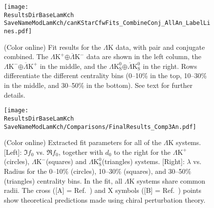 \documentclass[ALICE,manyauthors]{cernphprep}
\newcommand{\ResultsDirBaseLamKch}{/home/jesse/Analysis/FemtoAnalysis/Results/Results_cLamcKch_20190319/}
\newcommand{\ResultsDirBaseLamKs}{/home/jesse/Analysis/FemtoAnalysis/Results/Results_cLamK0_20190319/}
\newcommand{\MomRes}{_MomResCrctn}%
\newcommand{\NonFlatBgdLamKch}{_NonFlatBgdCrctnLamK0LamKchPolynomial}
\newcommand{\NonFlatBgdLamKs}{_NonFlatBgdCrctnLamK0LamKchPolynomial}
\newcommand{\ResNum}{_3Res}
\newcommand{\PrimMaxDecay}{_PrimMaxDecay10fm}
\newcommand{\ResMethod}{_UsingXiDataAndCoulombOnly}
\newcommand{\ParamFixAndShareLamKch}{_ShareLam_Dualie_ShareLam_ShareRadii}
\newcommand{\ParamFixAndShareLamKs}{_ShareLam_Dualie_ShareLam_ShareRadii}
\newcommand{\SaveNameModLamKch}{\MomRes\NonFlatBgdLamKch\ResNum\PrimMaxDecay\ResMethod\ParamFixAndShareLamKch}
\newcommand{\SaveNameModLamKs}{\MomRes\NonFlatBgdLamKs\ResNum\PrimMaxDecay\ResMethod\ParamFixAndShareLamKs}
\newcommand{\LamK}{$\Lambda$K\xspace}
\newcommand{\LamKchP}{$\Lambda\mathrm{K^{+}}$\xspace}
\newcommand{\ALamKchM}{$\overline{\Lambda}\mathrm{K^{-}}$\xspace}
\newcommand{\LamKchM}{$\Lambda\mathrm{K^{-}}$\xspace}
\newcommand{\ALamKchP}{$\overline{\Lambda}\mathrm{K^{+}}$\xspace}
\newcommand{\LamKs}{$\Lambda\mathrm{K^{0}_{S}}$\xspace}
\newcommand{\ALamKs}{$\overline{\Lambda}\mathrm{K^{0}_{S}}$\xspace}
\begin{document}
\begin{figure}[h!]
  \centering
  \texttt{[image: \\ResultsDirBaseLamKch\\SaveNameModLamKch/canKStarCfwFits\_CombineConj\_AllAn\_LabelLines.pdf]}
  \caption[\LamK data with fits]
  {
  (Color online) Fit results for the \LamK data, with pair and conjugate combined.
  The \LamKchP$\oplus$\ALamKchM data are shown in the left column, the \LamKchM$\oplus$\ALamKchP in the middle, and the \LamKs$\oplus$\ALamKs in the right. 
  Rows differentiate the different centrality bins (0--10\% in the top, 10--30\% in the middle, and 30--50\% in the bottom).
  See text for further details.
 }
  \label{fig:LamKFits_3Res}
\end{figure}



\begin{figure}[h]
  \centering
  \texttt{[image: \\ResultsDirBaseLamKch\\SaveNameModLamKch/Comparisons/FinalResults\_Comp3An.pdf]}
  \caption[Extracted Scattering Parameters]
  {
  (Color online) Extracted fit parameters for all of the \LamK systems.  
  [Left]: $\Im f_{0}$ vs. $\Re f_{0}$, together with $d_{0}$ to the right for the \LamKchP (circles), \LamKchM (squares) and \LamKs (triangles) systems.  
  [Right]: $\lambda$ vs. Radius for the 0--10\% (circles), 10--30\% (squares), and 30--50\% (triangles) centrality bins.  
  In the fit, all \LamK systems share common radii.
  The cross ([A] = Ref.\ \cite{Liu:2006xja}) and X symbols ([B] = Ref.\ \cite{Mai:2009ce}) points show theoretical predictions made using chiral perturbation theory.
  }
  \label{fig:ScattParams_3Res}
\end{figure}
\end{document}
